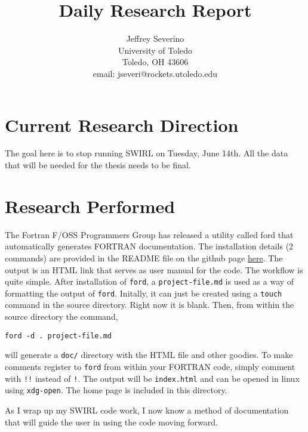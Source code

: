 \documentclass[a4paper]{article}
\begin{document}
\begin{titlepage}

    \title{
    Daily Research Report}

    \author{ Jeffrey Severino \\
        University of Toledo \\
        Toledo, OH  43606 \\
    email: jseveri@rockets.utoledo.edu}


    \maketitle

\end{titlepage}
\section{Current Research Direction}
The goal here is to stop running SWIRL on Tuesday, June 14th. All the data that 
will be needed for the thesis needs to be final.
\section{Research Performed}
The Fortran F/OSS Programmers Group has released a utility called ford that 
automatically generates FORTRAN documentation. The installation details (2 commands)
are provided in the README file on the github page \href{https://github.com/Fortran-FOSS-Programmers/ford}{here}. 
The output is an HTML link that serves as user manual for the code. The workflow is 
quite simple. After installation of \verb|ford|, a \verb|project-file.md| is used
as a way of formatting the output of \verb|ford|. Initally, it can just be created 
using a \verb|touch| command in the source directory. Right now it is blank. Then,
from within the source directory the command,

\begin{verbatim}
ford -d . project-file.md
\end{verbatim}
will generate a \verb|doc/| directory with the HTML file and other goodies. To make
comments register to \verb|ford| from within your FORTRAN code, simply comment with
\verb|!!| instead of \verb|!|. The output will be \verb|index.html| and can be 
opened in linux using \verb|xdg-open|. The home page is included in this directory.  

As I wrap up my SWIRL code work, I now know a method of documentation that will
guide the user in using the code moving forward.
\end{document}
